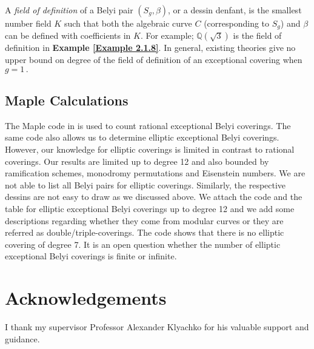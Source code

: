 \begin{rem}
 A \textit{field of definition} of a Belyi pair $(S_g, \beta)$, or a dessin denfant, is the smallest number field $K$ such that both the algebraic curve $C$ (corresponding to $S_g$) and $\beta$ can be defined with coefficients in $K$. For example; $\mathbb{Q}(\sqrt{3})$ is the field of definition in {\bf Example \ref{Example 2.1.8}}. In general, existing theories give no upper bound on degree of the field of definition of an exceptional covering when $g=1\,.$  
\end{rem}


\subsection{Maple Calculations}

The Maple code in \cite{Ku} is used to count rational exceptional Belyi coverings. The same code also allows us to determine elliptic exceptional Belyi coverings. However, our knowledge for elliptic coverings is limited in contrast to rational coverings. Our results are limited up to degree 12 and also bounded by ramification schemes, monodromy permutations and Eisenstein numbers. We are not able to list all Belyi pairs for elliptic coverings. Similarly, the respective dessins are not easy to draw as we discussed above. We attach the code and the table for elliptic exceptional Belyi coverings up to degree 12 and we add some descriptions regarding whether they come from modular curves or they are referred as double/triple-coverings. The code shows that there is no elliptic covering of degree 7.  It is an open question whether the number of elliptic exceptional Belyi coverings is finite or infinite. 





\section{Acknowledgements}
I thank my supervisor Professor Alexander Klyachko for his valuable support and guidance.






